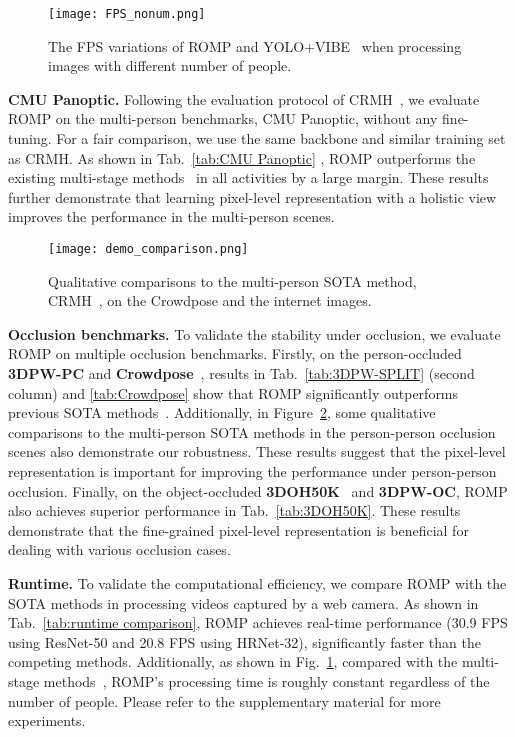 \documentclass[10pt,twocolumn,letterpaper]{article}
\begin{document}
\begin{figure}[t]
	\centering
	\texttt{[image: FPS\_nonum.png]} 
	\caption{ The FPS variations of ROMP and YOLO+VIBE~\cite{kocabas2020vibe} when processing images with different number of people.
}\vspace{-1mm}
	\label{fig:fps}
\end{figure}

\textbf{CMU Panoptic.} 
Following the evaluation protocol of CRMH~\cite{jiang2020coherent}, we evaluate ROMP on the multi-person benchmarks, CMU Panoptic, without any fine-tuning.
For a fair comparison, we use the same backbone and similar training set as CRMH.
As shown in Tab.~\ref{tab:CMU Panoptic} , ROMP outperforms the existing multi-stage  methods~\cite{jiang2020coherent,zanfir2018monocular,zanfir2018deep} in all activities by a large margin.
These results further demonstrate that learning pixel-level representation with a holistic view improves the performance in the multi-person scenes.

\begin{figure}[t]
	\centering
	\texttt{[image: demo\_comparison.png]}
	\caption{Qualitative comparisons to the multi-person SOTA method, CRMH~\cite{jiang2020coherent}, on the Crowdpose and the internet images.}\vspace{-5mm} 	\label{fig:demo_comparison}
\end{figure}

\textbf{Occlusion benchmarks.}
To validate the stability under occlusion, we evaluate ROMP on multiple occlusion benchmarks.
Firstly, on the person-occluded \textbf{3DPW-PC} and \textbf{Crowdpose}~\cite{crowdpose}, results in Tab.~\ref{tab:3DPW-SPLIT} (second column) and \ref{tab:Crowdpose} show that ROMP significantly outperforms previous SOTA methods~\cite{jiang2020coherent,kocabas2020vibe}.
Additionally, in Figure~\ref{fig:demo_comparison}, some qualitative comparisons to 
the multi-person SOTA methods in the person-person occlusion scenes also demonstrate our robustness.
These results suggest that the pixel-level representation is important for improving the performance under person-person occlusion.
Finally,  on the object-occluded \textbf{3DOH50K}~\cite{zhang2020object} and \textbf{3DPW-OC}, ROMP also achieves superior performance in Tab.~\ref{tab:3DOH50K}.
These results demonstrate that the fine-grained pixel-level representation is beneficial for dealing with various occlusion cases.

\textbf{Runtime.} 
To validate the computational efficiency, we compare ROMP with the SOTA methods in processing videos captured by a web camera.
As shown in Tab.~\ref{tab:runtime comparison}, ROMP achieves real-time performance (30.9 FPS using ResNet-50 and 20.8 FPS using HRNet-32), significantly faster than the competing methods.
Additionally, as shown in Fig.~\ref{fig:fps}, compared with the multi-stage methods~\cite{jiang2020coherent,kocabas2020vibe}, ROMP's processing time is roughly constant regardless of the number of people. 
Please refer to the supplementary material for more experiments.
\end{document}
